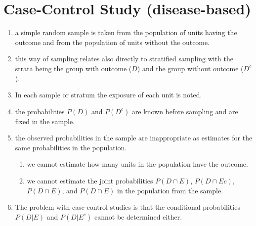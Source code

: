 \section{Case-Control Study (disease-based)}

\begin{enumerate}
    \item  a simple random sample is taken from the population of units having the outcome and from the population of units without the outcome.
    \hfill \cite{statistics/book/Statistics-for-Data-Scientists/Maurits-Kaptein}

    \item this way of sampling relates also directly to stratified sampling with the strata being the group with outcome ($D$) and the group without outcome ($D^c$).
    \hfill \cite{statistics/book/Statistics-for-Data-Scientists/Maurits-Kaptein}

    \item In each sample or stratum the exposure of each unit is noted.
    \hfill \cite{statistics/book/Statistics-for-Data-Scientists/Maurits-Kaptein}

    \item the probabilities $P (D)$ and $P (D^c)$ are known before sampling and are fixed in the sample.
    \hfill \cite{statistics/book/Statistics-for-Data-Scientists/Maurits-Kaptein}

    \item the observed probabilities in the sample are inappropriate as estimates for the same probabilities in the population.
    \hfill \cite{statistics/book/Statistics-for-Data-Scientists/Maurits-Kaptein}
    \begin{enumerate}
        \item we cannot estimate how many units in the population have the outcome.
        \hfill \cite{statistics/book/Statistics-for-Data-Scientists/Maurits-Kaptein}

        \item we cannot estimate the joint probabilities $P (D \cap E)$, $P (D \cap Ec)$, $P (D \cap E)$, and $P (D \cap E)$ in the population from the sample.
        \hfill \cite{statistics/book/Statistics-for-Data-Scientists/Maurits-Kaptein}
    \end{enumerate}

    \item The problem with case-control studies is that the conditional probabilities $P (D|E)$ and $P (D|E^c)$ cannot be determined either.
    \hfill \cite{statistics/book/Statistics-for-Data-Scientists/Maurits-Kaptein}
\end{enumerate}








